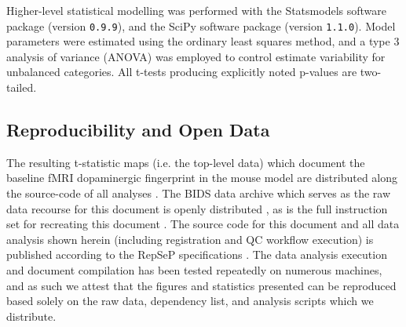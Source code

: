 Higher-level statistical modelling was performed with the Statsmodels software package \cite{statsmodels} (version \textcolor{mg}{\texttt{0.9.9}}), and the SciPy software package \cite{scipy} (version \textcolor{mg}{\texttt{1.1.0}}).
Model parameters were estimated using the ordinary least squares method, and a type 3 analysis of variance (ANOVA) was employed to control estimate variability for unbalanced categories.
All t-tests producing explicitly noted p-values are two-tailed.

\subsection{Reproducibility and Open Data}

The resulting t-statistic maps (i.e. the top-level data) which document the baseline fMRI dopaminergic fingerprint in the mouse model are distributed along the source-code of all analyses \cite{me}.
The BIDS \cite{bids} data archive which serves as the raw data recourse for this document is openly distributed \cite{opfvta_bidsdata}, as is the full instruction set for recreating this document \cite{me}.
The source code for this document and all data analysis shown herein (including registration and QC workflow execution) is published according to the RepSeP specifications \cite{repsep}.
The data analysis execution and document compilation has been tested repeatedly on numerous machines, and as such we attest that the figures and statistics presented can be reproduced based solely on the raw data, dependency list, and analysis scripts which we distribute.
